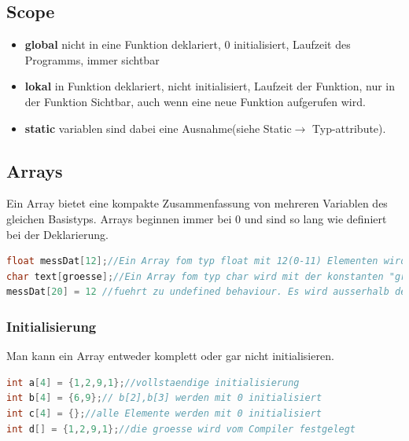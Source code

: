 \subsection{Scope}

\begin{itemize}[itemsep=1pt, parsep=0pt]
    \item \textbf{global} \newline nicht in eine Funktion deklariert, 0 initialisiert, Laufzeit des Programms, immer sichtbar
    \item \textbf{lokal} \newline in Funktion deklariert, nicht initialisiert, Laufzeit der Funktion, nur in der Funktion Sichtbar, auch wenn eine neue Funktion aufgerufen wird.
    \item \textbf{static} variablen sind dabei eine Ausnahme(siehe Static$\rightarrow$ Typ-attribute).
\end{itemize}

\subsection{Arrays}

Ein Array bietet eine kompakte Zusammenfassung von mehreren Variablen des gleichen Basistyps. Arrays beginnen immer bei 0 und sind so lang wie definiert bei der Deklarierung. 
\begin{lstlisting}[language = c]
float messDat[12];//Ein Array fom typ float mit 12(0-11) Elementen wird deklariert
char text[groesse];//Ein Array fom typ char wird mit der konstanten "groesse" initialisiert 
messDat[20] = 12 //fuehrt zu undefined behaviour. Es wird ausserhalb des Arrays '12' geschrieben. Es kann irgendeine Speicherstelle ueberschriben werden.
\end{lstlisting}

\subsubsection{Initialisierung}

Man kann ein Array entweder komplett oder gar nicht initialisieren.

\begin{lstlisting}[language = c]
int a[4] = {1,2,9,1};//vollstaendige initialisierung
int b[4] = {6,9};// b[2],b[3] werden mit 0 initialisiert
int c[4] = {};//alle Elemente werden mit 0 initialisiert
int d[] = {1,2,9,1};//die groesse wird vom Compiler festgelegt
\end{lstlisting}

